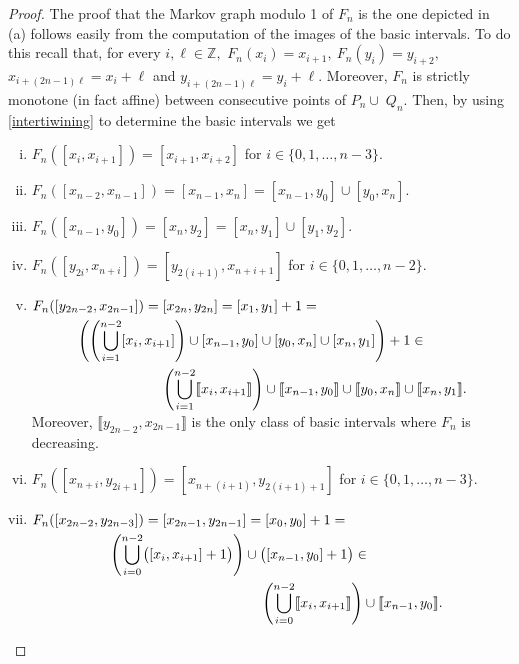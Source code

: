 \documentclass[a4paper, 11pt]{amsart}
\numberwithin{equation}{section}
\theoremstyle{customnumberedtheorem}
\theoremstyle{definitionwithbfnote}
\newcommand{\Z}{\ensuremath{\mathbb{Z}}}
\newcommand{\BIclass}[1]{\ensuremath{\llbracket #1\rrbracket}}
\begin{document}
\begin{proof}
The proof that the Markov graph modulo 1 of $F_n$ is the one depicted
in (a) follows easily from the computation of the images of the basic
intervals.
To do this recall that, for every $i,\ell \in \Z,$
$F_n(x_i) = x_{i+1},\ F_n(y_i) = y_{i+2},$
$x_{i + (2n-1)\ell} = x_i + \ell$ and $y_{i + (2n-1)\ell} = y_i + \ell.$
Moreover, $F_n$ is strictly monotone (in fact affine)
between consecutive points of $P_n \cup\; Q_n.$
Then, by using \eqref{intertiwining} to determine the basic intervals
we get
\begin{enumerate}[(i)]
\item $F_n([x_i, x_{i+1}]) = [x_{i+1},x_{i+2}]$ for $i \in \{0,1,\dots,n-3\}.$
\item $F_n([x_{n-2},x_{n-1}]) = [x_{n-1},x_{n}] = [x_{n-1}, y_0]\cup [y_0,x_n].$
\item $F_n([x_{n-1}, y_0]) = [x_n, y_2] = [x_n, y_1]\cup [y_1,y_2].$
\item $F_n([y_{2i}, x_{n+i}]) = [y_{2(i+1)}, x_{n+i+1}]$ for $i \in \{0,1,\dots,n-2\}.$
\item $\begin{multlined}[t][0.9\textwidth]
         F_n([y_{2n-2},x_{2n-1}]) = [x_{2n}, y_{2n}] = [x_1, y_1] + 1 =\\
             \left(\left(\bigcup\limits_{i=1}^{n-2} [x_i, x_{i+1}]\right) \cup
             [x_{n-1}, y_0] \cup [y_0, x_n] \cup [x_n, y_1]\right) + 1 \in \\
             \left(\bigcup\limits_{i=1}^{n-2} \BIclass{x_i, x_{i+1}}\right) \cup
             \BIclass{x_{n-1}, y_0}\cup
             \BIclass{y_0, x_n} \cup
             \BIclass{x_n, y_1}.
\end{multlined}$\newline
Moreover, $\BIclass{y_{2n-2},x_{2n-1}}$ is the only class of basic intervals
where $F_n$ is decreasing.
\item $F_n([x_{n+i}, y_{2i+1}]) = [x_{n+(i+1)}, y_{2(i+1)+1}]$ for $i \in \{0,1,\dots,n-3\}.$
\item $\begin{multlined}[t][0.85\textwidth]
          F_n([x_{2n-2},y_{2n-3}]) = [x_{2n-1}, y_{2n-1}] = [x_0, y_0] + 1 = \\
             \left(\bigcup\limits_{i=0}^{n-2} \bigl([x_i, x_{i+1}] + 1\bigr)\right) \cup
             \bigl([x_{n-1}, y_0] + 1\bigr) \in \\
             \left(\bigcup\limits_{i=0}^{n-2} \BIclass{x_i, x_{i+1}}\right) \cup \BIclass{x_{n-1}, y_0}.
\end{multlined}$

\end{enumerate}
\end{proof}
\end{document}
